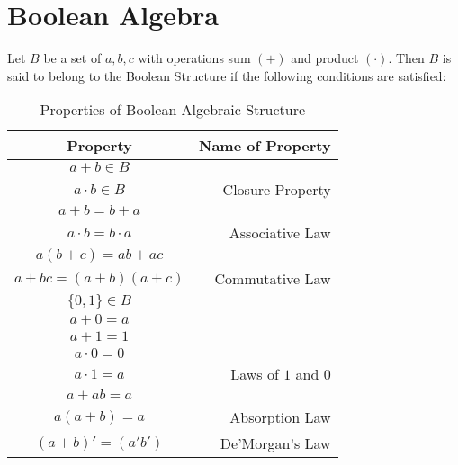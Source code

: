 \documentclass[../main.tex]{subfiles}
\begin{document}
	\chapter{Boolean Algebra}
	Let $B$ be a set of $a,b,c$ with operations sum $(+)$ and product $(\cdot)$.\newline
	Then $B$ is said to belong to the Boolean Structure if the following conditions are satisfied:
	\begin{table}[!h]
		\caption{Properties of Boolean Algebraic Structure}
		\label{boolean}
		\begin{center}
			\begin{tabular}{c|r}
				Property&Name of Property\\
				\hline
				$a+b \in B$\\$a \cdot b \in B$ & Closure Property\\
				\hline
				$a+b=b+a$\\
				$a \cdot b= b \cdot a$ & Associative Law\\
				\hline
				$a(b+c) = ab + ac $\\
				$a+bc=(a+b)(a+c)$ & Commutative Law\\
				\hline
				$\lbrace 0,1 \rbrace \in B$\\
				$a+0=a$\\
				$a+1=1$\\
				$a \cdot 0=0$\\
				$a \cdot 1=a$ & Laws of $1$ and $0$\\
				\hline
				$a+ab=a$\\
				$a(a+b)=a$ & Absorption Law\\
				\hline
				$(a+b)'=(a'b')$ & De'Morgan's Law
			\end{tabular}
		\end{center}
	\end{table}
\end{document}
